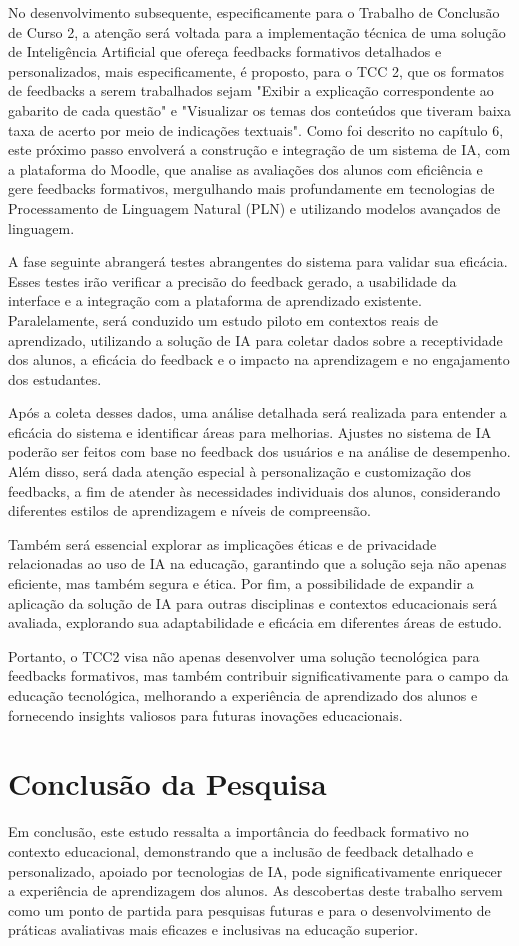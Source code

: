 No desenvolvimento subsequente, especificamente para o Trabalho de Conclusão de Curso 2, a atenção será voltada para a implementação técnica de uma solução de Inteligência Artificial que ofereça feedbacks formativos detalhados e personalizados, mais especificamente, é proposto, para o TCC 2, que os formatos de feedbacks a serem trabalhados sejam "Exibir a explicação correspondente ao gabarito de cada questão" e "Visualizar os temas dos conteúdos que tiveram baixa taxa de acerto por meio de indicações textuais". Como foi descrito no capítulo 6, este próximo passo envolverá a construção e integração de um sistema de IA, com a plataforma do Moodle, que analise as avaliações dos alunos com eficiência e gere feedbacks formativos, mergulhando mais profundamente em tecnologias de Processamento de Linguagem Natural (PLN) e utilizando modelos avançados de linguagem.

A fase seguinte abrangerá testes abrangentes do sistema para validar sua eficácia. Esses testes irão verificar a precisão do feedback gerado, a usabilidade da interface e a integração com a plataforma de aprendizado existente. Paralelamente, será conduzido um estudo piloto em contextos reais de aprendizado, utilizando a solução de IA para coletar dados sobre a receptividade dos alunos, a eficácia do feedback e o impacto na aprendizagem e no engajamento dos estudantes.

Após a coleta desses dados, uma análise detalhada será realizada para entender a eficácia do sistema e identificar áreas para melhorias. Ajustes no sistema de IA poderão ser feitos com base no feedback dos usuários e na análise de desempenho. Além disso, será dada atenção especial à personalização e customização dos feedbacks, a fim de atender às necessidades individuais dos alunos, considerando diferentes estilos de aprendizagem e níveis de compreensão.

Também será essencial explorar as implicações éticas e de privacidade relacionadas ao uso de IA na educação, garantindo que a solução seja não apenas eficiente, mas também segura e ética. Por fim, a possibilidade de expandir a aplicação da solução de IA para outras disciplinas e contextos educacionais será avaliada, explorando sua adaptabilidade e eficácia em diferentes áreas de estudo.

Portanto, o TCC2 visa não apenas desenvolver uma solução tecnológica para feedbacks formativos, mas também contribuir significativamente para o campo da educação tecnológica, melhorando a experiência de aprendizado dos alunos e fornecendo insights valiosos para futuras inovações educacionais.

\section{Conclusão da Pesquisa}

Em conclusão, este estudo ressalta a importância do feedback formativo no contexto educacional, demonstrando que a inclusão de feedback detalhado e personalizado, apoiado por tecnologias de IA, pode significativamente enriquecer a experiência de aprendizagem dos alunos. As descobertas deste trabalho servem como um ponto de partida para pesquisas futuras e para o desenvolvimento de práticas avaliativas mais eficazes e inclusivas na educação superior.